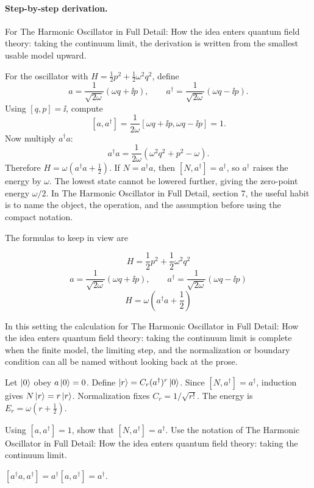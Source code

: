 \paragraph{Step-by-step derivation.}

For The Harmonic Oscillator in Full Detail: How the idea enters quantum field theory: taking the continuum limit, the derivation is written from the smallest usable model upward.

For the oscillator with \(H=\frac12p^2+\frac12\omega^2q^2\), define
\[
  a=\frac{1}{\sqrt{2\omega}}(\omega q+\ii p),\qquad
  a^\dagger=\frac{1}{\sqrt{2\omega}}(\omega q-\ii p).
\]
Using \([q,p]=\ii\), compute
\[
  [a,a^\dagger]
  =
  \frac{1}{2\omega}[\omega q+\ii p,\omega q-\ii p]=1.
\]
Now multiply \(a^\dagger a\):
\[
  a^\dagger a=\frac{1}{2\omega}(\omega^2q^2+p^2-\omega).
\]
Therefore \(H=\omega(a^\dagger a+\frac12)\).  If \(N=a^\dagger a\), then \([N,a^\dagger]=a^\dagger\), so \(a^\dagger\) raises the energy by \(\omega\).  The lowest state cannot be lowered further, giving the zero-point energy \(\omega/2\).  In The Harmonic Oscillator in Full Detail, section 7, the useful habit is to name the object, the operation, and the assumption before using the compact notation.

The formulas to keep in view are

\[
  H=\frac12p^2+\frac12\omega^2q^2
\]
\[
  a=\frac{1}{\sqrt{2\omega}}(\omega q+\ii p),\qquad a^\dagger=\frac{1}{\sqrt{2\omega}}(\omega q-\ii p)
\]
\[
  H=\omega\left(a^\dagger a+\frac12\right)
\]

In this setting the calculation for The Harmonic Oscillator in Full Detail: How the idea enters quantum field theory: taking the continuum limit is complete when the finite model, the limiting step, and the normalization or boundary condition can all be named without looking back at the prose.




\begin{example}
Let \(\left|0\right\rangle\) obey \(a\left|0\right\rangle=0\).  Define \(\left|r\right\rangle=C_r(a^\dagger)^r\left|0\right\rangle\).  Since \([N,a^\dagger]=a^\dagger\), induction gives \(N\left|r\right\rangle=r\left|r\right\rangle\).  Normalization fixes \(C_r=1/\sqrt{r!}\).  The energy is \(E_r=\omega(r+\frac12)\).
\end{example}



\begin{exercise}
Using \([a,a^\dagger]=1\), show that \([N,a^\dagger]=a^\dagger\).  Use the notation of The Harmonic Oscillator in Full Detail: How the idea enters quantum field theory: taking the continuum limit.
\begin{answer}
\([a^\dagger a,a^\dagger]=a^\dagger[a,a^\dagger]=a^\dagger\).
\end{answer}
\end{exercise}

